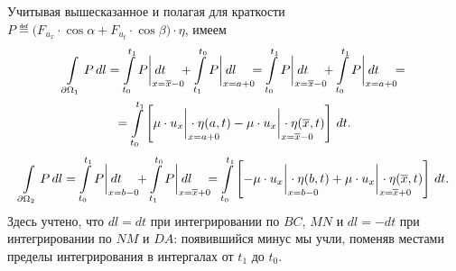 Учитывая вышесказанное и полагая для краткости $P\eqdef\big(F_{u_x}\cdot\cos\alpha+F_{u_t}\cdot\cos\beta\big)\cdot\eta$, имеем
\begin{multline}
	\label{l11:eq:2}
	\int\limits_{\partial\Omega_1}P\,dl=\int\limits_{t_0}^{t_1}P\bigg|_{\lefteqn{\scriptstyle x=\overline{x}-0}}\,dt\quad+\int\limits_{t_1}^{t_0}P\bigg|_{\lefteqn{\scriptstyle x=a+0}}\,dl\quad=\int\limits_{t_0}^{t_1}P\bigg|_{\lefteqn{\scriptstyle x=\overline{x}-0}}\,dt\quad+\int\limits_{t_0}^{t_1}P\bigg|_{\lefteqn{\scriptstyle x=a+0}}\,dt\quad=\\
	=\int\limits_{t_0}^{t_1}\left[\mu\cdot u_x\bigg|_{\lefteqn{\scriptstyle x=a+0}}\cdot\eta(a,t)-\mu\cdot u_x\bigg|_{\lefteqn{\scriptstyle x=\overline{x}-0}}\cdot\eta(\overline{x},t)\right]\,dt.
\end{multline}  
\begin{equation}
	\label{l11:eq:3}
	\int\limits_{\partial\Omega_2}P\,dl=\int\limits_{t_0}^{t_1}P\bigg|_{\lefteqn{\scriptstyle x=b-0}}\,dt\quad+\int\limits_{t_1}^{t_0}P\bigg|_{\lefteqn{\scriptstyle x=\overline{x}+0}}\,dl\quad=\int\limits_{t_0}^{t_1}\left[-\mu\cdot u_x\bigg|_{\lefteqn{\scriptstyle x=b-0}}\cdot\eta(b,t)+\mu\cdot u_x\bigg|_{\lefteqn{\scriptstyle x=\overline{x}+0}}\cdot\eta(\overline{x},t)\right]\,dt.
\end{equation}
Здесь учтено, что $dl=dt$ при интегрировании по $BC$, $M\!N$ и $dl=-dt$ при интегрировании по $N\!M$ и $D\!A$: появившийся минус мы учли, поменяв местами пределы интегрирования в интергалах от $t_1$ до $t_0$.

